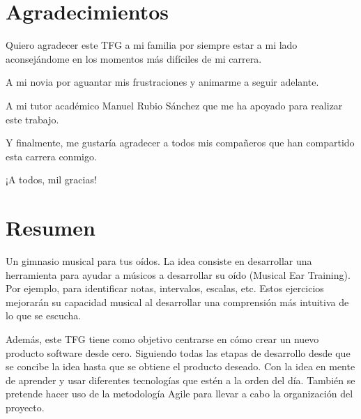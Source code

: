 \documentclass[12pt,twoside,titlepage]{report}
\newcommand\blankpage{%
    \newpage
    \null
    \thispagestyle{empty}%
    \newpage}
\begin{document}
\hypersetup{pageanchor=true}
\normalsize
\afterpage{\blankpage}
 
\setlength{\parskip}{0.75em}
\renewcommand{\baselinestretch}{1.25}

\setcounter{page}{2}


 

\chapter*{Agradecimientos}

Quiero agradecer este TFG a mi familia por siempre estar a mi lado aconsejándome en los momentos más difíciles de mi carrera. 

A mi novia por aguantar mis frustraciones y animarme a seguir adelante. 

A mi tutor académico Manuel Rubio Sánchez que me ha apoyado para realizar este trabajo. 

Y finalmente, me gustaría agradecer a todos mis compañeros que han compartido esta carrera conmigo.

¡A todos, mil gracias!
\afterpage{\blankpage}


 

\chapter*{Resumen}
Un gimnasio musical para tus oídos. La idea consiste en desarrollar una herramienta para ayudar a músicos a desarrollar su oído (Musical Ear Training). Por ejemplo, para identificar notas, intervalos, escalas, etc. Estos ejercicios mejorarán su capacidad musical al desarrollar una comprensión más intuitiva de lo que se escucha.

Además, este TFG tiene como objetivo centrarse en cómo crear un nuevo producto software desde cero. Siguiendo todas las etapas de desarrollo desde que se concibe la idea hasta que se obtiene el producto deseado. Con la idea en mente de aprender y usar diferentes tecnologías que estén a la orden del día. También se pretende hacer uso de la metodología Agile para llevar a cabo la organización del proyecto.
\end{document}
